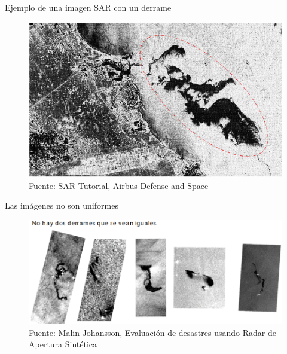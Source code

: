 \begin{frame}{Ejemplo de una imagen SAR con un derrame}
    \begin{figure}
        \centering
        \includegraphics[scale=0.6]{img/section_03/oil_slick}
        \caption{Fuente: SAR Tutorial, Airbus Defense and Space}
        \label{fig:section_03_dinamica_sar_petroleo}
    \end{figure}
\end{frame}

\begin{frame}{Las imágenes no son uniformes}
    \begin{figure}
        \centering
        \includegraphics[scale=0.35]{img/section_03/oil_slick_02}
        \caption{Fuente: Malin Johansson, Evaluación de desastres usando Radar de Apertura Sintética}
        \label{fig:section_03_dinamica_sar_petroleo}
    \end{figure}
\end{frame}

